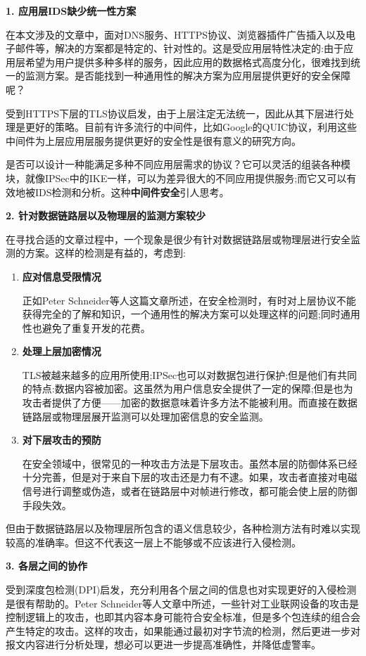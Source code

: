 \documentclass[12pt]{article} %
\begin{document}
\textbf{1. 应用层IDS缺少统一性方案}

在本文涉及的文章中，面对DNS服务、HTTPS协议、浏览器插件广告插入以及电子邮件等，解决的方案都是特定的、针对性的。这是受应用层特性决定的:由于应用层希望为用户提供多种多样的服务，因此应用的数据格式高度分化，很难找到统一的监测方案。是否能找到一种通用性的解决方案为应用层提供更好的安全保障呢？

受到HTTPS下层的TLS协议启发，由于上层注定无法统一，因此从其下层进行处理是更好的策略。目前有许多流行的中间件，比如Google的QUIC协议，利用这些中间件为上层应用层服务提供更好的安全性是很有意义的研究方向。

是否可以设计一种能满足多种不同应用层需求的协议？它可以灵活的组装各种模块，就像IPSec中的IKE一样，可以为差异很大的不同应用提供服务;而它又可以有效地被IDS检测和分析。这种\textbf{中间件安全}引人思考。

\textbf{2. 针对数据链路层以及物理层的监测方案较少}

在寻找合适的文章过程中，一个现象是很少有针对数据链路层或物理层进行安全监测的方案。这样的检测是有益的，考虑到:

\begin{enumerate}
    \item \textbf{应对信息受限情况}

    正如Peter Schneider等人这篇文章所述，在安全检测时，有时对上层协议不能获得完全的了解和知识，一个通用性的解决方案可以处理这样的问题;同时通用性也避免了重复开发的花费。

    \item \textbf{处理上层加密情况}

    TLS被越来越多的应用所使用;IPSec也可以对数据包进行保护;但是他们有共同的特点:数据内容被加密。这虽然为用户信息安全提供了一定的保障;但是也为攻击者提供了方便——加密的数据意味着许多方法不能被利用。而直接在数据链路层或物理层展开监测可以处理加密信息的安全监测。

    \item \textbf{对下层攻击的预防}

    在安全领域中，很常见的一种攻击方法是下层攻击。虽然本层的防御体系已经十分完善，但是对于来自下层的攻击还是力有不逮。如果，攻击者直接对电磁信号进行调整或伪造，或者在链路层中对帧进行修改，都可能会使上层的防御手段失效。
\end{enumerate}

但由于数据链路层以及物理层所包含的语义信息较少，各种检测方法有时难以实现较高的准确率。但这不代表这一层上不能够或不应该进行入侵检测。

\textbf{3. 各层之间的协作}

受到深度包检测(DPI)启发，充分利用各个层之间的信息也对实现更好的入侵检测是很有帮助的。Peter Schneider等人\cite{cyber_phy}文章中所述，一些针对工业联网设备的攻击是控制逻辑上的攻击，也即其内容本身可能符合安全标准，但是多个包连续的组合会产生特定的攻击。这样的攻击，如果能通过最初对字节流的检测，然后更进一步对报文内容进行分析处理，想必可以更进一步提高准确性，并降低虚警率。
\end{document}
